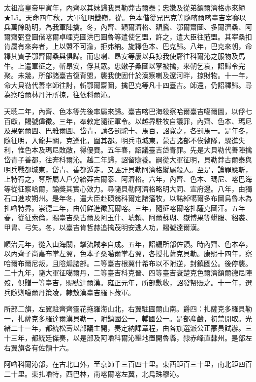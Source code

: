 \begin{pinyinscope}
太祖高皇帝甲寅年，內齊以其妹歸我貝勒莽古爾泰；忠嫩及從弟額爾濟格亦來締★L5。天命四年秋，大軍征明鐵嶺，從。色本偕從兄巴克等隨喀爾喀臺吉宰賽以兵萬餘助明，為我軍陣擒。冬，內齊、額爾濟格、額騰、鄂爾齋圖、多爾濟桑、阿爾齋弼登圖偕喀爾卓哩克圖洪巴圖魯等遣使乞盟，許之，遣大臣往蒞盟。其宰桑扣肯屬有來奔者，上以盟不可渝，拒弗納。旋釋色本、巴克歸。八年，巴克來朝，命釋其質子鄂齊爾桑與俱歸。而忠喇、昂安等屢以兵掠我使齎往科爾沁之服物及馬牛。上遣軍征之，斬昂安，俘其眾。忠嫩子桑圖以孥被擒，來朝乞哀，詔歸令完聚。未幾，所部諸臺吉復背盟，襲我使固什於漢察喇及遼河畔，掠財物。十一年，命大貝勒代善率師往討，斬鄂爾齋圖，擒巴克等凡十四臺吉。師還，仍詔釋歸。尋為察哈爾林丹汗所掠，往依科爾沁。

天聰二年，內齊、色本等先後率屬來歸。臺吉喀巴海殺察哈爾臺吉噶爾圖，以俘七百獻，賜號偉徵。三年，奉敕定隨征軍令。以越界駐牧自議罪，內齊、色本、瑪尼及果弼爾圖、巴雅爾圖、岱青，請各罰駝十、馬百，詔寬之，各罰馬一。是年冬，隨征明，入龍井關，克遵化，圍其都。明兵屯城東，蒙古諸部不俟整隊，驟進失利，惟色本及瑪尼敗敵，得優賚。五年春，詔議臺吉岱青罪。先是大貝勒代善陣擒岱青子善都，往奔科爾沁。越二年歸，詔留贍養。嗣從大軍征明，貝勒莽古爾泰與明兵戰都城東，岱青、善都遁走。又誣訐貝勒阿濟格縱屬殺人。至是，論罪應斬，上特宥之，奪所屬人戶分給莽古爾泰、阿濟格。六年，內齊、色本、瑪尼、喀巴海等從征察哈爾，諭獎其實心效力。尋隨貝勒阿濟格略明大同、宣府邊。八年，由獨石口進攻朔州。是年冬，遣大臣赴碩翁科爾定諸籓牧，以諾綽噶爾多布圖烏魯木為扎嚕特界。崇德二年，由朝鮮進徵瓦爾喀。三年，隨征喀爾喀扎薩克圖汗。五年春，從征索倫，賜臺吉桑古爾及阿玉什、琥賴、阿爾蘇瑚、嶽博果等蟒服、貂裘、甲胄、弓矢。冬，以臺吉肯哲赫追擒茂明安逃人功，賜號達爾漢。

順治元年，從入山海關，擊流賊李自成。五年，詔編所部佐領。時內齊、色本卒，以內齊子尚嘉布掌左翼，色本子桑噶爾掌右翼，各授扎薩克貝勒。康熙十四年，察哈爾布爾尼叛，且陰煽諸部。二等臺吉根翼什希布以不附逆，封鎮國公。後停襲。二十九年，隨大軍征噶爾丹，二等臺吉科克晉、四等臺吉袞楚克色爾濟額爾德尼陣歿，俱贈一等臺吉，賜號達爾漢。雍正元年，所部歉收，詔發帑賑之。十一年，選兵隨剿噶爾丹策凌，隸敖漢臺吉羅卜藏軍。

所部二旗，左翼駐齊齊靈花拖羅海山北，右翼駐圖爾山南。爵四：扎薩克多羅貝勒一，扎薩克多羅達爾漢貝勒一，附鎮國公一，輔國公一。是部產鹼，初禁開取。光緒二十一年，都統松壽以部議主開，奏定納課章程，由各旗選派公正蒙員試辦。三十三年，都統廷傑奏，以是部及阿嚕科爾沁墾地置開魯縣，隸赤峰直隸州。是部左右翼旗各有佐領十六。

阿嚕科爾沁部，在古北口外，至京師千三百四十里。東西距百三十里，南北距四百二十里。東扎嚕特，西巴林，南喀爾喀左翼，北烏珠穆沁。


\end{pinyinscope}
